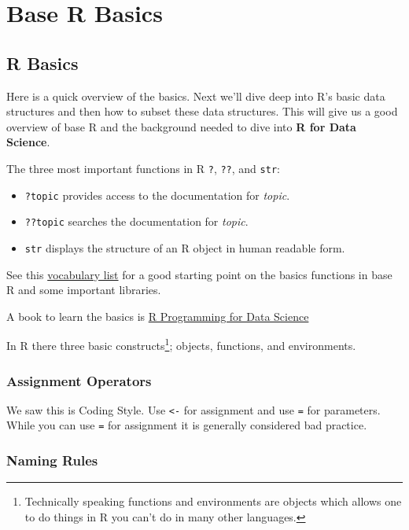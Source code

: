 \documentclass[]{book}
\providecommand{\tightlist}{%
  \setlength{\itemsep}{0pt}\setlength{\parskip}{0pt}}
\let\rmarkdownfootnote\footnote%
\def\footnote{\protect\rmarkdownfootnote}
\theoremstyle{definition}
\theoremstyle{definition}
\theoremstyle{definition}
\theoremstyle{remark}
\begin{document}
\part{Base R Basics}\label{part-base-r-basics}

\chapter{R Basics}\label{baser-rbasics}

Here is a quick overview of the basics. Next we'll dive deep into R's
basic data structures and then how to subset these data structures. This
will give us a good overview of base R and the background needed to dive
into \textbf{R for Data Science}.

The three most important functions in R \texttt{?}, \texttt{??}, and
\texttt{str}:

\begin{itemize}
\tightlist
\item
  \texttt{?topic} provides access to the documentation for \emph{topic}.
\item
  \texttt{??topic} searches the documentation for \emph{topic}.
\item
  \texttt{str} displays the structure of an R object in human readable
  form.
\end{itemize}

See this \href{http://adv-r.had.co.nz/Vocabulary.html}{vocabulary list}
for a good starting point on the basics functions in base R and some
important libraries.

A book to learn the basics is
\href{https://bookdown.org/rdpeng/rprogdatascience/}{R Programming for
Data Science}

In R there three basic constructs\footnote{Technically speaking
  functions and environments are objects which allows one to do things
  in R you can't do in many other languages.}; objects, functions, and
environments.

\section{Assignment Operators}\label{assignment-operators}

We saw this is Coding Style. Use \texttt{\textless{}-} for assignment
and use \texttt{=} for parameters. While you can use \texttt{=} for
assignment it is generally considered bad practice.

\section{Naming Rules}\label{naming-rules}
\end{document}
